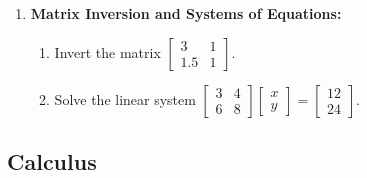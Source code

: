 \documentclass{16384_doc}
\begin{document}
\begin{enumerate}[label=\textbf{Question \alph*},leftmargin=*, align=left]
    \begin{tcolorbox}[height=15cm]
    \end{tcolorbox}

    \item[\textbf{Question f (10 points)}] \textbf{Matrix Inversion and Systems of Equations:}
    \begin{enumerate}[label=(\roman*)]
        \item Invert the matrix $\begin{bmatrix} 3 & 1 \\ 1.5 & 1 \end{bmatrix}$.
        \item Solve the linear system $\begin{bmatrix} 3 & 4 \\ 6 & 8 \end{bmatrix} \begin{bmatrix} x \\ y \end{bmatrix} = \begin{bmatrix} 12 \\ 24 \end{bmatrix}$.
    \end{enumerate}

    \begin{tcolorbox}[height=3cm]
    \end{tcolorbox}
\end{enumerate}
\subsection{Calculus}
\end{document}
